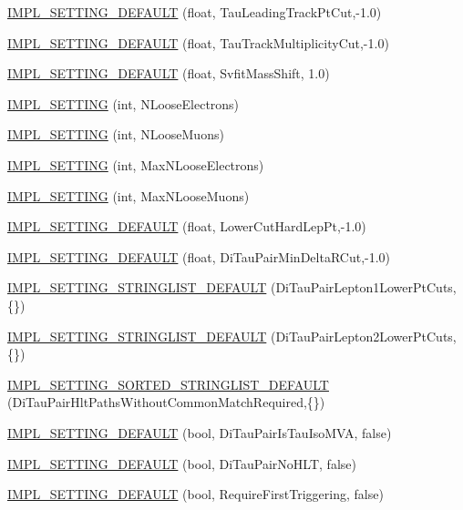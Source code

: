 \begin{DoxyCompactItemize}
\item 
\hyperlink{classHttSettings_a589c74328a3eccca2bd0ab46f667df15}{IMPL\_\-SETTING\_\-DEFAULT} (float, TauLeadingTrackPtCut,-\/1.0)
\item 
\hyperlink{classHttSettings_a71d7c6ca9c1d8304ebb02c4ad4393962}{IMPL\_\-SETTING\_\-DEFAULT} (float, TauTrackMultiplicityCut,-\/1.0)
\item 
\hyperlink{classHttSettings_ab04b9f8ef9fb66c65a4832f199d6867c}{IMPL\_\-SETTING\_\-DEFAULT} (float, SvfitMassShift, 1.0)
\item 
\hyperlink{classHttSettings_a37f7d51513391d0069be00e70ac80d6c}{IMPL\_\-SETTING} (int, NLooseElectrons)
\item 
\hyperlink{classHttSettings_a5aeb8f008ab1bbc858b8057335997611}{IMPL\_\-SETTING} (int, NLooseMuons)
\item 
\hyperlink{classHttSettings_a95f6a64613094769937b40065e7aadcd}{IMPL\_\-SETTING} (int, MaxNLooseElectrons)
\item 
\hyperlink{classHttSettings_adc4635682f2e9862ce8b2fb48bd253e3}{IMPL\_\-SETTING} (int, MaxNLooseMuons)
\item 
\hyperlink{classHttSettings_a630faf528cca577605aec717039f7114}{IMPL\_\-SETTING\_\-DEFAULT} (float, LowerCutHardLepPt,-\/1.0)
\item 
\hyperlink{classHttSettings_a3a66cee45e0ac72fda735e26fa63fe76}{IMPL\_\-SETTING\_\-DEFAULT} (float, DiTauPairMinDeltaRCut,-\/1.0)
\item 
\hyperlink{classHttSettings_a5dc15345059d488018fdadd26c298f24}{IMPL\_\-SETTING\_\-STRINGLIST\_\-DEFAULT} (DiTauPairLepton1LowerPtCuts,\{\})
\item 
\hyperlink{classHttSettings_ac90837d592db267590fd1587b8189b94}{IMPL\_\-SETTING\_\-STRINGLIST\_\-DEFAULT} (DiTauPairLepton2LowerPtCuts,\{\})
\item 
\hyperlink{classHttSettings_aad257d690e6fabf2ff987740523bd9bb}{IMPL\_\-SETTING\_\-SORTED\_\-STRINGLIST\_\-DEFAULT} (DiTauPairHltPathsWithoutCommonMatchRequired,\{\})
\item 
\hyperlink{classHttSettings_a628ac5fc04df1c3f59616431a6401868}{IMPL\_\-SETTING\_\-DEFAULT} (bool, DiTauPairIsTauIsoMVA, false)
\item 
\hyperlink{classHttSettings_a3460424a36d89e264f3636661324bb24}{IMPL\_\-SETTING\_\-DEFAULT} (bool, DiTauPairNoHLT, false)
\item 
\hyperlink{classHttSettings_ae0424bba45f16e9ee28b093ee6cf26eb}{IMPL\_\-SETTING\_\-DEFAULT} (bool, RequireFirstTriggering, false)
\item 

\end{DoxyCompactItemize}

